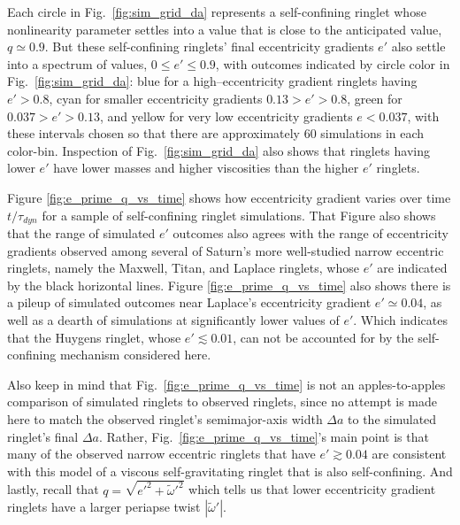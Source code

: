 \documentclass[preprint]{aastex62}
\begin{document}
Each circle in Fig.\ \ref{fig:sim_grid_da} represents a self-confining ringlet whose
nonlinearity parameter settles into a value that is close to the anticipated value, $q\simeq0.9$.
But these self-confining ringlets' final eccentricity gradients $e'$ also settle 
into a spectrum of values, $0\le e' \le 0.9$, with
outcomes indicated by circle color in Fig.\ \ref{fig:sim_grid_da}:
blue for a high--eccentricity gradient ringlets having 
$e'> 0.8$, cyan for smaller eccentricity gradients $0.13>e'>0.8$, green for $0.037>e'>0.13$,
and yellow for very low eccentricity gradients $e<0.037$,
with these intervals chosen so that there are approximately 60 simulations in each color-bin.
Inspection of Fig.\ \ref{fig:sim_grid_da} also shows that ringlets having lower $e'$ have
lower masses and higher viscosities than the higher $e'$ ringlets.

Figure \ref{fig:e_prime_q_vs_time} shows how eccentricity gradient varies over time $t/\tau_{dyn}$
for a sample of  self-confining ringlet simulations. That Figure also shows 
that the range of simulated $e'$ outcomes also agrees with the 
range of eccentricity gradients observed among several of Saturn's more well-studied narrow eccentric
ringlets, namely the Maxwell, Titan, and Laplace ringlets, whose $e'$ are
indicated by the black horizontal lines.
Figure \ref{fig:e_prime_q_vs_time} also shows there is a pileup of simulated 
outcomes near Laplace's eccentricity gradient $e'\simeq0.04$, as well as a dearth of simulations
at significantly lower values of $e'$. Which indicates that the Huygens ringlet, whose $e'\lesssim0.01$, 
can not be accounted for by the self-confining mechanism considered here.

Also keep in mind that Fig.\ \ref{fig:e_prime_q_vs_time} is not an apples-to-apples comparison 
of simulated ringlets to observed ringlets, since no attempt is made here to match
the observed ringlet's semimajor-axis width $\Delta a$ to the simulated ringlet's final $\Delta a$.
Rather,  Fig.\ \ref{fig:e_prime_q_vs_time}'s main point is that many of the observed narrow
eccentric ringlets that have $e'\gtrsim0.04$ are consistent with
this model of a viscous self-gravitating ringlet that is also self-confining.
And lastly, recall that $q=\sqrt{e'^2 + \tilde{\omega}'^2}$ which tells us that lower eccentricity gradient
ringlets have a larger periapse twist $|\tilde{\omega}'|$.
\end{document}
